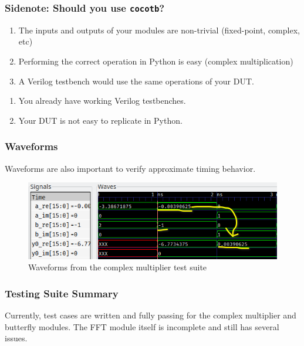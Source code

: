 \documentclass{beamer}
\begin{document}
\begin{frame}
	\frametitle{Sidenote: Should you use \texttt{cocotb}?}
	\begin{enumerate}
		\item The inputs and outputs of your modules are 
			non-trivial (fixed-point, complex, etc)
		\item Performing the correct operation in 
			Python is easy (complex multiplication)
		\item A Verilog testbench would use the 
			same operations of your DUT.
	\end{enumerate}

	\begin{enumerate}
		\item You already have working Verilog testbenches.
		\item Your DUT is not easy to replicate in Python.
	\end{enumerate}
\end{frame}

\begin{frame}
	\frametitle{Waveforms}
	Waveforms are also important to verify approximate timing behavior.
	\begin{figure}
		\includegraphics[width=\linewidth]{./../first_report/figures/cplx_mul_waveform.png}
		\caption{Waveforms from the complex multiplier test suite}
		\centering
	\end{figure}
\end{frame}

\begin{frame}[fragile]
	\frametitle{Testing Suite Summary}
	Currently, test cases are written and fully passing for the complex multiplier
	and butterfly modules. The FFT module itself is incomplete and still has several issues.

\end{frame}
\end{document}
